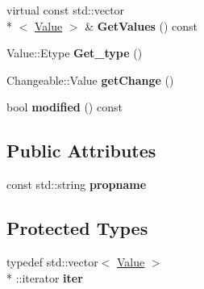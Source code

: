 \begin{DoxyCompactItemize}
\item 
\hypertarget{classProperty_a075dc0610fe9aba50a50ce8f099c0751}{virtual const std\-::vector\\*
$<$ \hyperlink{classValue}{Value} $>$ \& {\bfseries Get\-Values} () const }\label{classProperty_a075dc0610fe9aba50a50ce8f099c0751}

\item 
\hypertarget{classProperty_ad4dfa2bc05c8f80dc4e554fde59538a4}{Value\-::\-Etype {\bfseries Get\-\_\-type} ()}\label{classProperty_ad4dfa2bc05c8f80dc4e554fde59538a4}

\item 
\hypertarget{classProperty_af38f129e65933845e4114835b5abdcd4}{Changeable\-::\-Value {\bfseries get\-Change} ()}\label{classProperty_af38f129e65933845e4114835b5abdcd4}

\item 
\hypertarget{classProperty_a6eb065e2efbbacb73c840001ac69c056}{bool {\bfseries modified} () const }\label{classProperty_a6eb065e2efbbacb73c840001ac69c056}

\end{DoxyCompactItemize}
\subsection*{Public Attributes}
\begin{DoxyCompactItemize}
\item 
\hypertarget{classProperty_a9b1096a84a64a0595ab8d79e836d3266}{const std\-::string {\bfseries propname}}\label{classProperty_a9b1096a84a64a0595ab8d79e836d3266}

\end{DoxyCompactItemize}
\subsection*{Protected Types}
\begin{DoxyCompactItemize}
\item 
\hypertarget{classProperty_a916e46cc6991261d59af94cd70b23953}{typedef std\-::vector$<$ \hyperlink{classValue}{Value} $>$\\*
\-::iterator {\bfseries iter}}\label{classProperty_a916e46cc6991261d59af94cd70b23953}

\end{DoxyCompactItemize}
